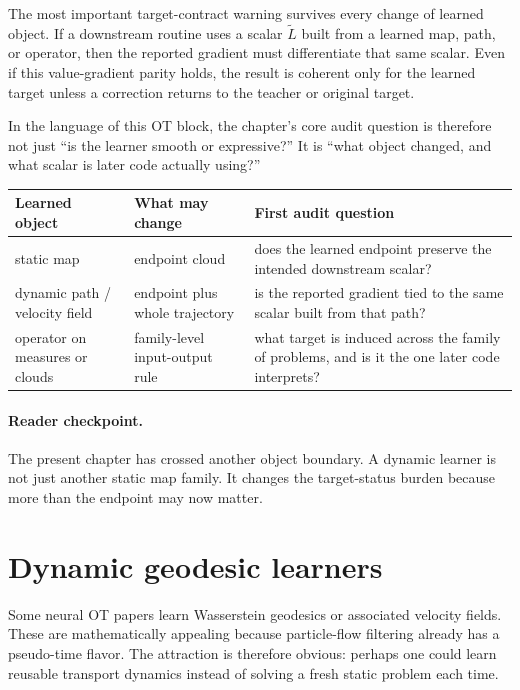 The most important target-contract warning survives every change of learned
object.  If a downstream routine uses a scalar \(\widetilde L\) built from a
learned map, path, or operator, then the reported gradient must differentiate
that same scalar.  Even if this value-gradient parity holds, the result is
coherent only for the learned target unless a correction returns to the teacher
or original target.

In the language of this OT block, the chapter’s core audit question is therefore
not just ``is the learner smooth or expressive?''  It is ``what object changed,
and what scalar is later code actually using?''

\begin{center}
\small
\begin{tabular}{p{} p{} p{}}
\toprule
Learned object & What may change & First audit question \\
\midrule
static map & endpoint cloud & does the learned endpoint preserve the intended downstream scalar? \\
dynamic path / velocity field & endpoint plus whole trajectory & is the reported gradient tied to the same scalar built from that path? \\
operator on measures or clouds & family-level input-output rule & what target is induced across the family of problems, and is it the one later code interprets? \\
\bottomrule
\end{tabular}
\end{center}

\paragraph{Reader checkpoint.}
The present chapter has crossed another object boundary.  A dynamic learner is
not just another static map family.  It changes the target-status burden because
more than the endpoint may now matter.

\section{Dynamic geodesic learners}
\label{sec:bf-neural-ot-dynamic-geodesic}

Some neural OT papers learn Wasserstein geodesics or associated velocity fields.
These are mathematically appealing because particle-flow filtering already has a
pseudo-time flavor.  The attraction is therefore obvious: perhaps one could
learn reusable transport dynamics instead of solving a fresh static problem each
time.

